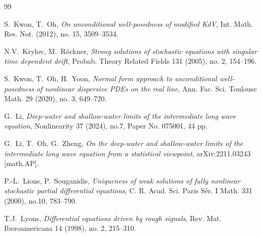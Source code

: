 \documentclass[letterpaper, 11pt,  reqno]{amsart}
\newcommand{\1}{\hspace{0.5mm}\text{I}\hspace{0.5mm}}
\numberwithin{equation}{section}
\numberwithin{theorem}{section}
\begin{document}
\begin{thebibliography}{99}
%
%
%


%
%


%
%
%



S.~Kwon, T.~Oh, 
{\it  On unconditional well-posedness of modified KdV}, Int. Math. Res. Not. (2012), no. 15, 3509--3534. 


N.V.~Krylov,  M.~R\"ockner,
{\it Strong solutions of stochastic equations with singular time dependent drift},
Probab. Theory Related Fields 131 (2005), no. 2, 154--196. 





S.~Kwon, T.~Oh, H.~Yoon, 
{\it Normal form approach to unconditional well-posedness of nonlinear dispersive PDEs on the real line}, Ann. Fac. Sci. Toulouse Math. 29 (2020), no. 3, 649--720. 



G.~Li, 
{\it Deep-water and shallow-water limits of the intermediate long wave equation}, 
 Nonlinearity 37 (2024), no.7, Paper No. 075001, 44 pp. 
 
 
G.~Li, T.~Oh, G.~Zheng,
{\it On the deep-water and shallow-water limits of the intermediate long wave equation from a statistical viewpoint}, 
arXiv:2211.03243 [math.AP].


P.-L.~Lions, P.~Souganidis, 
{\it Uniqueness of weak solutions of fully nonlinear stochastic partial differential equations},
C. R. Acad. Sci. Paris S\'er. I Math. 331 (2000), no.10, 783--790.


T.J.~Lyons,
{\it Differential equations driven by rough signals},
Rev. Mat. Iberoamericana 14 (1998), no. 2, 215--310.





\end{thebibliography}
\end{document}
